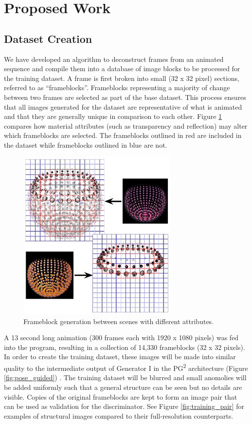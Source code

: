 \documentclass[letterpaper]{article} %
\begin{document}
\section{Proposed Work}
\label{sec:proposed_work}
\subsection{Dataset Creation}
\label{subsec:data}
We have developed an algorithm to deconstruct frames from an animated sequence
and compile them into a database of image blocks to be processed for the
training dataset.
A frame is first broken into
small (32 x 32 pixel) sections, referred to as ``frameblocks''.
Frameblocks representing a majority of change between two frames
are selected as part of the base dataset.
This process ensures that all images generated for the dataset
are representative of what is animated and that they are generally unique
in comparison to each other.
Figure \ref{fig:frameblock_generation} compares how material attributes
(such as transparency and reflection) may alter which frameblocks are selected.
The frameblocks outlined in red are
included in the dataset while frameblocks outlined in blue are not.

\begin{figure}[htbp]
\centerline{\includegraphics[width=8cm]{frameblock_generation.png}}
\caption{Frameblock generation between scenes with different attributes.}
\label{fig:frameblock_generation}
\end{figure}

A 13 second long animation (300 frames each with 1920 x 1080 pixels) was fed into the program,
resulting in a collection of 14,330 frameblocks (32 x 32 pixels).
In order to create the training dataset, these images will be
made into similar quality
to the intermediate output of Generator I 
in the PG\textsuperscript{2} architecture
(Figure \ref{fig:pose_guided}) \cite{pose_guided_image_generation}.
The training dataset will be blurred and small anomolies will be added uniformly
such that a general structure can be seen but no details are visible.
Copies of the original frameblocks are kept to form an image pair that can be used
as validation for the discriminator.
See Figure \ref{fig:training_pair} for examples of structural images
compared to their full-resolution counterparts.
\end{document}

